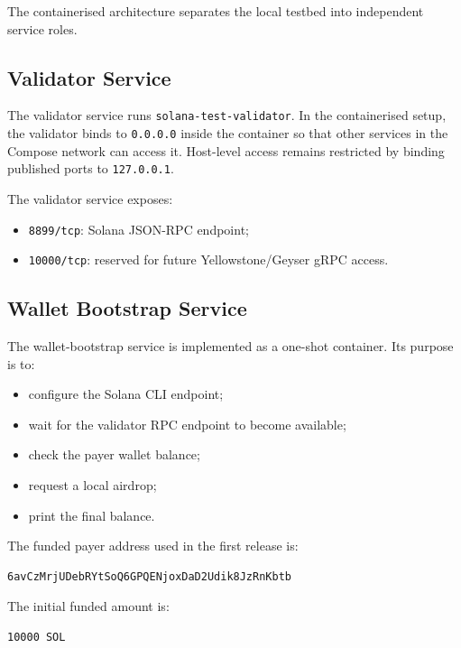 \documentclass[11pt,a4paper]{article}
\begin{document}
The containerised architecture separates the local testbed into independent service roles.

\subsection{Validator Service}

The validator service runs \texttt{solana-test-validator}. In the containerised setup, the validator binds to \texttt{0.0.0.0} inside the container so that other services in the Compose network can access it. Host-level access remains restricted by binding published ports to \texttt{127.0.0.1}.

The validator service exposes:

\begin{itemize}[leftmargin=2em]
  \item \texttt{8899/tcp}: Solana JSON-RPC endpoint;
  \item \texttt{10000/tcp}: reserved for future Yellowstone/Geyser gRPC access.
\end{itemize}

\subsection{Wallet Bootstrap Service}

The wallet-bootstrap service is implemented as a one-shot container. Its purpose is to:

\begin{itemize}[leftmargin=2em]
  \item configure the Solana CLI endpoint;
  \item wait for the validator RPC endpoint to become available;
  \item check the payer wallet balance;
  \item request a local airdrop;
  \item print the final balance.
\end{itemize}

The funded payer address used in the first release is:

\begin{lstlisting}
6avCzMrjUDebRYtSoQ6GPQENjoxDaD2Udik8JzRnKbtb
\end{lstlisting}

The initial funded amount is:

\begin{lstlisting}
10000 SOL
\end{lstlisting}
\end{document}
